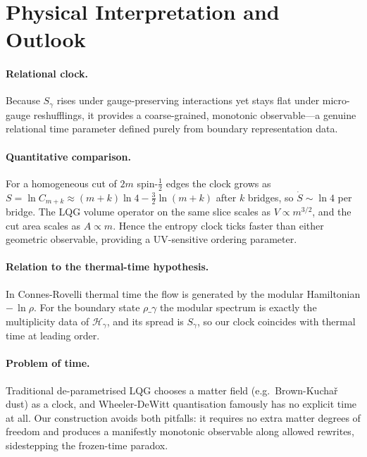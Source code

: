 \documentclass[11pt]{article}
\newcommand{\Hil}{\mathcal{H}}
\newcommand{\Cut}{\gamma}
\begin{document}



\section{Physical Interpretation and Outlook}\label{sec:outlook}

\paragraph{Relational clock.}

Because $S_{\Cut}$ rises under gauge-preserving interactions yet stays flat
under micro-gauge reshufflings, it provides a coarse-grained, monotonic
observable—a genuine relational time parameter defined purely from boundary
representation data.

\paragraph{Quantitative comparison.}
For a homogeneous cut of $2m$ spin-$\tfrac12$ edges the clock grows as
$S=\ln C_{m+k}\!\approx\!(m+k)\ln4-\tfrac32\!\ln(m+k)$ after $k$ bridges,
so $\dot S\!\sim\!\ln4$ per bridge.
The LQG volume operator on the same slice scales as $V\!\propto\!m^{3/2}$,
and the cut area scales as $A\!\propto\!m$.
Hence the entropy clock ticks faster than either geometric observable,
providing a UV-sensitive ordering parameter.

\paragraph{Relation to the thermal-time hypothesis.}
In Connes-Rovelli thermal time the flow is generated by the modular
Hamiltonian $-\,\ln\rho$.
For the boundary state $\rho\_{\Cut}$ the modular spectrum is exactly the
multiplicity data of $\Hil_\Cut$, and its spread is $S_{\Cut}$,
so our clock coincides with thermal time at leading order.

\paragraph{Problem of time.}
Traditional de-parametrised LQG chooses a matter field (e.g.\ Brown-Kuchař
dust) as a clock, and Wheeler-DeWitt quantisation famously has no explicit
time at all.
Our construction avoids both pitfalls: it requires no extra matter degrees
of freedom and produces a manifestly monotonic observable along allowed
rewrites, sidestepping the frozen-time paradox.
\end{document}
